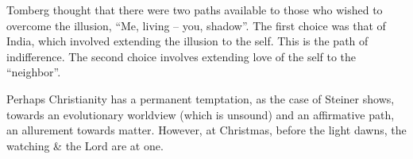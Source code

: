 Tomberg thought that there were two paths available to those who wished to overcome the illusion, ``Me, living -- you, shadow''. The first choice was that of India, which involved extending the illusion to the self. This is the path of indifference. The second choice involves extending love of the self to the ``neighbor''.

Perhaps Christianity has a permanent temptation, as the case of Steiner shows, towards an evolutionary worldview (which is unsound) and an affirmative path, an allurement towards matter. However, at Christmas, before the light dawns, the watching \& the Lord are at one.



